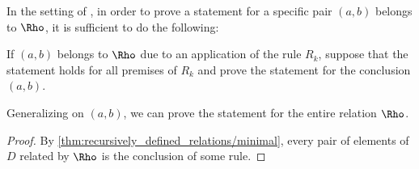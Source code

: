 \begin{theorem}\label{thm:induction_on_recursively_defined_relations}
  In the setting of , in order to prove a statement for a specific pair \( (a, b) \) belongs to \( \Rho \), it is sufficient to do the following:
  \begin{displayquote}
    If \( (a, b) \) belongs to \( \Rho \) due to an application of the rule \( R_k \), suppose that the statement holds for all premises of \( R_k \) and prove the statement for the conclusion \( (a, b) \).
  \end{displayquote}

  Generalizing on \( (a, b) \), we can prove the statement for the entire relation \( \Rho \).
\end{theorem}
\begin{proof}
  By \cref{thm:recursively_defined_relations/minimal}, every pair of elements of \( D \) related by \( \Rho \) is the conclusion of some rule.
\end{proof}

